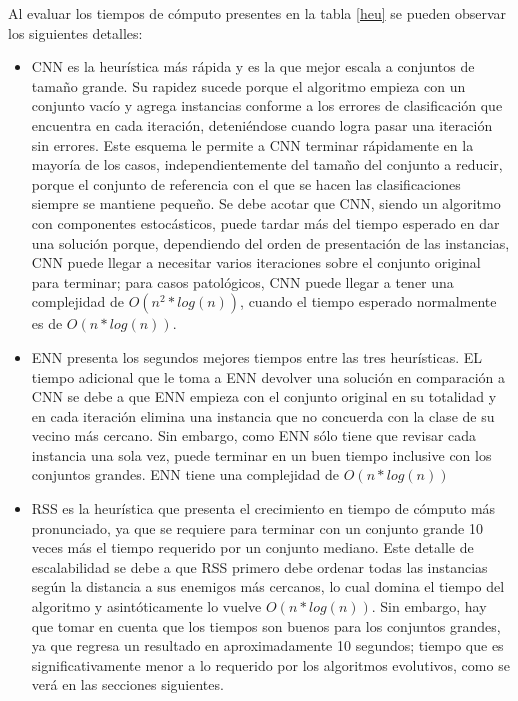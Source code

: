 Al evaluar los tiempos de cómputo presentes en la tabla \ref{heu} se pueden observar los siguientes detalles:

\begin{itemize}

\item CNN es la heurística más rápida y es la que mejor escala a conjuntos de tamaño grande. Su rapidez sucede porque el algoritmo empieza con un conjunto vacío y agrega instancias conforme a los errores de clasificación que encuentra en cada iteración, deteniéndose cuando logra pasar una iteración sin errores. Este esquema le permite a CNN terminar rápidamente en la mayoría de los casos, independientemente del tamaño del conjunto a reducir, porque el conjunto de referencia con el que se hacen las clasificaciones siempre se mantiene pequeño. Se debe acotar que CNN, siendo un algoritmo con componentes estocásticos, puede tardar más del tiempo esperado en dar una solución porque, dependiendo del orden de presentación de las instancias, CNN puede llegar a necesitar varios iteraciones sobre el conjunto original para terminar; para casos patológicos, CNN puede llegar a tener una complejidad de $O(n^2*log(n))$, cuando el tiempo esperado normalmente es de $O(n*log(n))$.

\item ENN presenta los segundos mejores tiempos entre las tres heurísticas. EL tiempo adicional que le toma a ENN devolver una solución en comparación a CNN se debe a que ENN empieza con el conjunto original en su totalidad y en cada iteración elimina una instancia que no concuerda con la clase de su vecino más cercano. Sin embargo, como ENN sólo tiene que revisar cada instancia una sola vez, puede terminar en un buen tiempo inclusive con los conjuntos grandes. ENN tiene una complejidad de $O(n*log(n))$  

\item RSS es la heurística que presenta el crecimiento en tiempo de cómputo más pronunciado, ya que se requiere para terminar con un conjunto grande 10 veces más el tiempo requerido por un conjunto mediano. Este detalle de escalabilidad se debe a que RSS primero debe ordenar todas las instancias según la distancia a sus enemigos más cercanos, lo cual domina el tiempo del algoritmo y asintóticamente lo vuelve $O(n*log(n))$. Sin embargo, hay que tomar en cuenta que los tiempos son buenos para los conjuntos grandes, ya que regresa un resultado en aproximadamente 10 segundos; tiempo que es significativamente menor a lo requerido por los algoritmos evolutivos, como se verá en las secciones siguientes.

\end{itemize}

